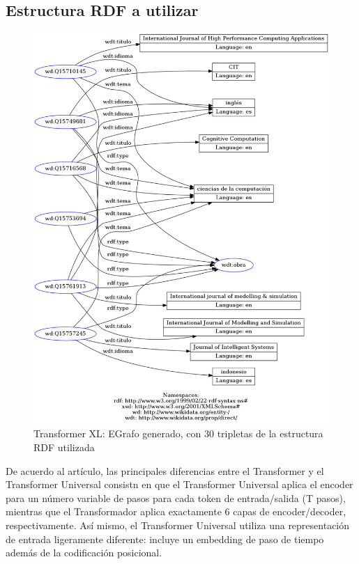 \documentclass[conference]{IEEEtran}
\begin{document}
\subsection{Estructura RDF a utilizar}

\begin{figure}[h]
\includegraphics[scale=0.25]{imagenes/grafo_rdf_30.jpeg} 
\caption{Transformer XL: EGrafo generado, con 30 tripletas de la estructura RDF utilizada \cite{b2}}
\end{figure} 

\vspace{0.2cm}

De acuerdo al art\'iculo, las principales diferencias entre el Transformer y el Transformer Universal consistn en que el Transformer Universal aplica el encoder para un n\'umero variable de pasos para cada token de entrada/salida (T pasos), mientras que el Transformador aplica exactamente $6$ capas de encoder/decoder, respectivamente. As\'i mismo, el Transformer Universal utiliza una representaci\'on de entrada ligeramente diferente: incluye un embedding de paso de tiempo adem\'as de la codificaci\'on posicional.
\end{document}
